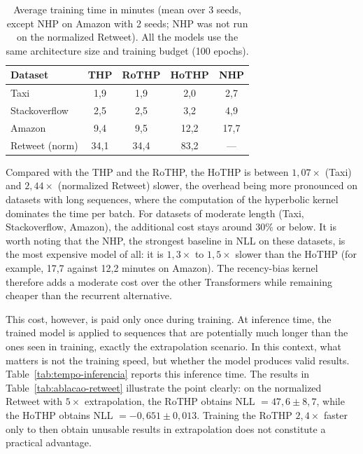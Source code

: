 \begin{table}[h!]
\centering
\caption{Average training time in minutes (mean over 3 seeds, except NHP on Amazon with 2 seeds; NHP was not run on the normalized Retweet). All the models use the same architecture size and training budget (100 epochs).}
\label{tab:tempo-treino}
\begin{tabular}{lcccc}
\toprule
Dataset & THP & RoTHP & HoTHP & NHP \\
\midrule
Taxi           &  1,9 &  1,9 &  2,0 &  2,7 \\
Stackoverflow  &  2,5 &  2,5 &  3,2 &  4,9 \\
Amazon         &  9,4 &  9,5 & 12,2 & 17,7 \\
Retweet (norm) & 34,1 & 34,4 & 83,2 & --- \\
\bottomrule
\end{tabular}
\end{table}

Compared with the THP and the RoTHP, the HoTHP is between $1{,}07\times$ (Taxi) and $2{,}44\times$ (normalized Retweet) slower, the overhead being more pronounced on datasets with long sequences, where the computation of the hyperbolic kernel dominates the time per batch. For datasets of moderate length (Taxi, Stackoverflow, Amazon), the additional cost stays around $30\%$ or below. It is worth noting that the NHP, the strongest baseline in NLL on these datasets, is the most expensive model of all: it is $1{,}3\times$ to $1{,}5\times$ slower than the HoTHP (for example, 17,7 against 12,2 minutes on Amazon). The recency-bias kernel therefore adds a moderate cost over the other Transformers while remaining cheaper than the recurrent alternative.

This cost, however, is paid only once during training. At inference time, the trained model is applied to sequences that are potentially much longer than the ones seen in training, exactly the extrapolation scenario. In this context, what matters is not the training speed, but whether the model produces valid results. Table~\ref{tab:tempo-inferencia} reports this inference time. The results in Table~\ref{tab:ablacao-retweet} illustrate the point clearly: on the normalized Retweet with $5\times$ extrapolation, the RoTHP obtains NLL $= 47{,}6 \pm 8{,}7$, while the HoTHP obtains NLL $= -0{,}651 \pm 0{,}013$. Training the RoTHP $2{,}4\times$ faster only to then obtain unusable results in extrapolation does not constitute a practical advantage.

